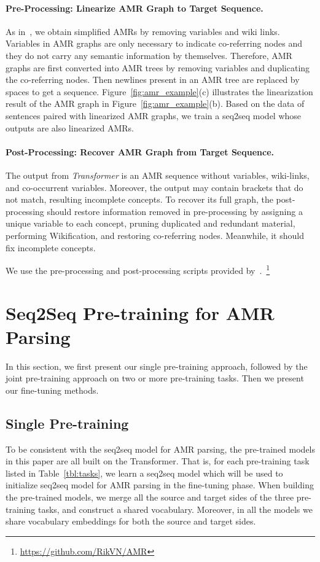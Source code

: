 \documentclass[11pt,a4paper]{article}
\begin{document}
\paragraph{Pre-Processing: Linearize AMR Graph to Target Sequence.} As in~\citet{noord_bos_2017}, we obtain simplified AMRs by removing variables and wiki links. Variables in AMR graphs are only necessary to indicate co-referring nodes and they do not carry any semantic information by themselves. Therefore, AMR graphs are first converted into AMR trees by removing variables and duplicating the co-referring nodes. Then newlines present in an AMR tree are replaced by spaces to get a sequence. Figure~\ref{fig:amr_example}(c) illustrates the linearization result of the AMR graph in Figure~\ref{fig:amr_example}(b). Based on the data of sentences paired with linearized AMR graphs, we train a seq2seq model whose outputs are also linearized AMRs.

\paragraph{Post-Processing: Recover AMR Graph from Target Sequence.} The output from {\em Transformer} is an AMR sequence without variables, wiki-links, and co-occurrent variables. Moreover, the output may contain brackets that do not match, resulting incomplete concepts. To recover its full graph, the post-processing should restore information removed in pre-processing by assigning a unique variable to each concept, pruning duplicated and redundant material, performing Wikification, and restoring co-referring nodes. Meanwhile, it should fix incomplete concepts.

We use the pre-processing and post-processing scripts provided by~\citet{noord_bos_2017}.~\footnote{\url{ https://github.com/RikVN/AMR}}

\section{Seq2Seq Pre-training for AMR Parsing}
In this section, we first present our single pre-training approach, followed by the joint pre-training approach on two or more pre-training tasks. Then we present our fine-tuning methods.

\subsection{Single Pre-training}
To be consistent with the seq2seq model for AMR parsing, the pre-trained models in this paper are all built on the Transformer. That is, for each pre-training task listed in Table~\ref{tbl:tasks}, we learn a seq2seq model which will be used to initialize seq2seq model for AMR parsing in the fine-tuning phase. When building the pre-trained models, we merge all the source and target sides of the three pre-training tasks, and construct a shared vocabulary. Moreover, in all the models we share vocabulary embeddings for both the source and target sides. 
\end{document}
